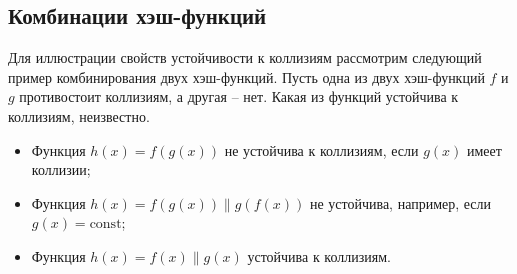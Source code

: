 \subsection{Комбинации хэш-функций}

Для иллюстрации свойств устойчивости к коллизиям рассмотрим следующий пример комбинирования двух хэш-функций. Пусть одна из двух хэш-функций $f$ и $g$ противостоит коллизиям, а другая -- нет. Какая из функций устойчива к коллизиям, неизвестно.
\begin{itemize}
    \item Функция $h(x) = f(g(x))$ не устойчива к коллизиям, если $g(x)$ имеет коллизии;
    \item Функция $h(x) = f(g(x)) \| g(f(x))$ не устойчива, например, если $g(x) = \textrm{const}$;
    \item Функция $h(x) = f(x) \| g(x)$ устойчива к коллизиям.
\end{itemize}
